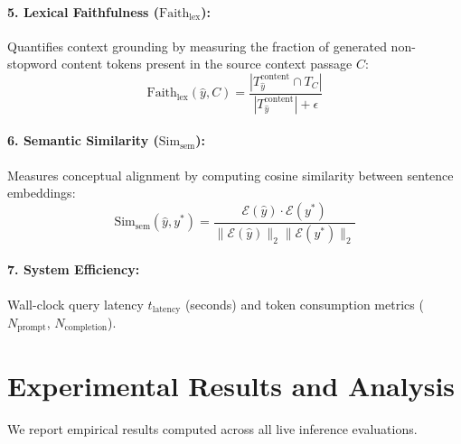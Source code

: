 \documentclass[11pt]{article}
\begin{document}
\paragraph{5. Lexical Faithfulness ($\text{Faith}_{\text{lex}}$):} Quantifies context grounding by measuring the fraction of generated non-stopword content tokens present in the source context passage $C$:
\begin{equation}
\text{Faith}_{\text{lex}}(\hat{y}, C) = \frac{|T_{\hat{y}}^{\text{content}} \cap T_{C}|}{|T_{\hat{y}}^{\text{content}}| + \epsilon}
\end{equation}

\paragraph{6. Semantic Similarity ($\text{Sim}_{\text{sem}}$):} Measures conceptual alignment by computing cosine similarity between sentence embeddings:
\begin{equation}
\text{Sim}_{\text{sem}}(\hat{y}, y^*) = \frac{\mathcal{E}(\hat{y}) \cdot \mathcal{E}(y^*)}{\|\mathcal{E}(\hat{y})\|_2 \|\mathcal{E}(y^*)\|_2}
\end{equation}

\paragraph{7. System Efficiency:} Wall-clock query latency $t_{\text{latency}}$ (seconds) and token consumption metrics ($N_{\text{prompt}}$, $N_{\text{completion}}$).

\section{Experimental Results and Analysis}
\label{sec:results}

We report empirical results computed across all live inference evaluations.
\end{document}
